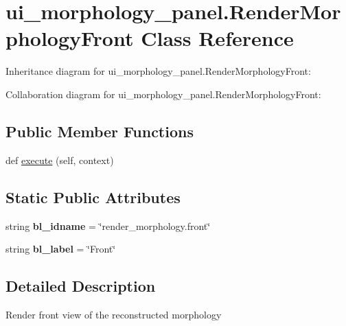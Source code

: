 \hypertarget{classui__morphology__panel_1_1RenderMorphologyFront}{}\section{ui\+\_\+morphology\+\_\+panel.\+Render\+Morphology\+Front Class Reference}
\label{classui__morphology__panel_1_1RenderMorphologyFront}


Inheritance diagram for ui\+\_\+morphology\+\_\+panel.\+Render\+Morphology\+Front\+:


Collaboration diagram for ui\+\_\+morphology\+\_\+panel.\+Render\+Morphology\+Front\+:
\subsection*{Public Member Functions}
\begin{DoxyCompactItemize}
\item 
def \hyperlink{classui__morphology__panel_1_1RenderMorphologyFront_a0e92c4535cae1745b914d11e1fe88f05}{execute} (self, context)
\end{DoxyCompactItemize}
\subsection*{Static Public Attributes}
\begin{DoxyCompactItemize}
\item 
string {\bfseries bl\+\_\+idname} = \char`\"{}render\+\_\+morphology.\+front\char`\"{}\hypertarget{classui__morphology__panel_1_1RenderMorphologyFront_ae24ecefc35f1313ea57989adb243420b}{}\label{classui__morphology__panel_1_1RenderMorphologyFront_ae24ecefc35f1313ea57989adb243420b}

\item 
string {\bfseries bl\+\_\+label} = \char`\"{}Front\char`\"{}\hypertarget{classui__morphology__panel_1_1RenderMorphologyFront_a11aa3e716412a5b729928167bfd99247}{}\label{classui__morphology__panel_1_1RenderMorphologyFront_a11aa3e716412a5b729928167bfd99247}

\end{DoxyCompactItemize}


\subsection{Detailed Description}
\begin{DoxyVerb}Render front view of the reconstructed morphology\end{DoxyVerb}
 

